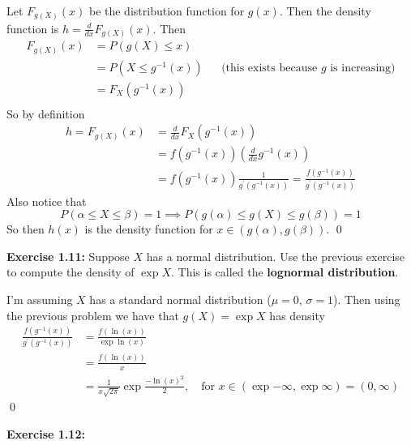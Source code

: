\begin{mdframed}
    Let $F_{g(X)}(x)$ be the distribution function for $g(x)$. Then the density function is $h = \frac{d}{dx}F_{g(X)}(x)$. Then  
    \begin{align*}
        F_{g(X)}(x) &= P(g(X) \leq x) \\
        &= P(X \leq g^{-1}(x)) && \text{(this exists because $g$ is increasing)} \\
        &= F_X(g^{-1}(x)) \\
    \end{align*}
    So by definition 
    \begin{align*}
        h = F_{g(X)}(x) &= \frac{d}{dx}F_X(g^{-1}(x)) \\
        &=f(g^{-1}(x)) \left(\frac{d}{dx}g^{-1}(x) \right)\\
        &=f(g^{-1}(x))\frac{1}{g^\prime(g^{-1}(x))} = \frac{f(g^{-1}(x))}{g^\prime(g^{-1}(x))} 
    \end{align*}
    Also notice that 
    \[P(\alpha \leq X \leq \beta)=1 \implies P(g(\alpha) \leq g(X) \leq g(\beta)) = 1\]
    So then $h(x)$ is the density function for $x \in (g(\alpha), g(\beta))$.
    \qed
\end{mdframed}
\textbf{Exercise 1.11:} Suppose $X$ has a normal distribution. Use the previous exercise to compute the density of $\exp{X}$. This is called the \textbf{lognormal distribution}.
\begin{mdframed}
    I'm assuming $X$ has a standard normal distribution ($\mu = 0, \, \sigma=1$). Then using the previous problem we have that $g(X) = \exp{X}$ has density
    \begin{align*}
        \frac{f(g^{-1} (x))}{g^\prime(g^{-1}(x))} &= \frac{f(\ln(x))}{\exp{\ln(x)}}\\
        &= \frac{f(\ln(x))}{x} \\
        &= \frac{1}{x\sqrt{2\pi}}\exp{\frac{-\ln(x)^2}{2}}, \quad \text{for $x \in (\exp{-\infty}, \exp{\infty}) = (0, \infty)$}
    \end{align*}\qed
\end{mdframed}
\textbf{Exercise 1.12:} 
